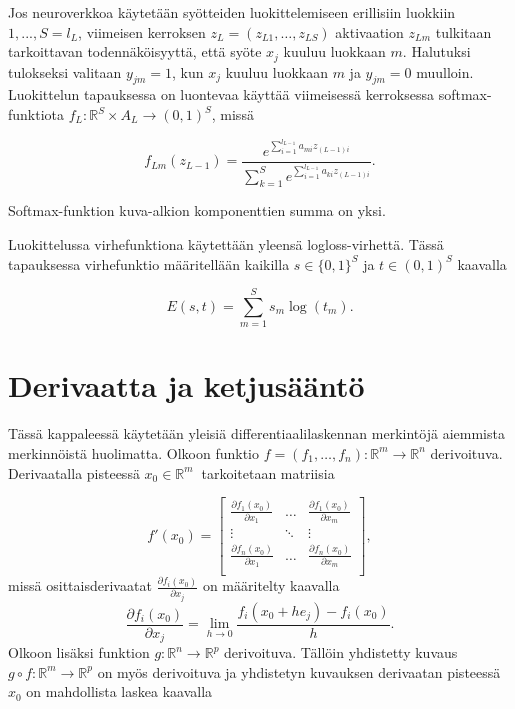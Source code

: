 \documentclass[11pt]{article}
\begin{document}
 Jos neuroverkkoa käytetään syötteiden luokittelemiseen erillisiin luokkiin $1, ..., S = l_L$, viimeisen kerroksen $z_L = (z_{L1}, \hdots, z_{LS})$ aktivaation $z_{Lm}$ tulkitaan tarkoittavan todennäköisyyttä, että syöte $x_j$ kuuluu luokkaan $m$. Halutuksi tulokseksi valitaan $y_{jm} = 1$, kun $x_j$ kuuluu luokkaan $m$ ja $y_{jm} = 0$ muulloin. Luokittelun tapauksessa on luontevaa käyttää viimeisessä kerroksessa softmax-funktiota $f_L : \mathbb{R}^S \times A_L \to (0, 1)^S$, missä

\begin{large}
\begin{equation*}
f_{Lm}(z_{L - 1}) = \frac{e^{\sum_{i = 1}^{l_{L - 1}} a_{mi} z_{(L - 1)i}}}{\sum_{k = 1} ^ {S}e^{\sum_{i = 1}^{l_{L - 1}} a_{ki} z_{(L - 1)i}}} .
\end{equation*}
\end{large}
Softmax-funktion kuva-alkion komponenttien summa on yksi.

Luokittelussa virhefunktiona käytettään yleensä logloss-virhettä. Tässä tapauksessa virhefunktio määritellään kaikilla $s \in \{0, 1\}^S$ ja $t \in (0, 1) ^ S$ kaavalla

\begin{equation*}
E(s, t) = \sum_{m = 1}^{S} s_m \log(t_m).
\end{equation*}

\section{Derivaatta ja ketjusääntö}
Tässä kappaleessä käytetään yleisiä differentiaalilaskennan merkintöjä aiemmista merkinnöistä huolimatta. Olkoon funktio $f = (f_1, \hdots, f_n) : \mathbb{R}^m \to \mathbb{R}^n$ derivoituva. Derivaatalla pisteessä $x_0 \in \mathbb{R}^m\ $ tarkoitetaan matriisia

\begin{equation*}
f'(x_0) = \left[
\begin{matrix}
\frac{\partial f_1(x_0)}{\partial x_1} & \hdots & \frac{\partial f_1(x_0)}{\partial x_m} \\
\vdots  & \ddots & \vdots  \\
\frac{\partial f_n(x_0)}{\partial x_1} & \hdots  & \frac{\partial f_n(x_0)}{\partial x_m} \\
\end{matrix}
 \right],
\end{equation*} missä osittaisderivaatat $\frac{\partial f_i(x_0)}{\partial x_j}$ on määritelty kaavalla 
\begin{equation*}
\frac{\partial f_i(x_0)}{\partial x_j} = \lim_{h \to 0} \frac{f_i(x_0 + h e_j) - f_i(x_0)}{h}.
\end{equation*}
\newpage
Olkoon lisäksi funktion $g : \mathbb{R}^n \to \mathbb{R}^p$ derivoituva. Tällöin yhdistetty kuvaus $g \circ f : \mathbb{R}^m \to \mathbb{R}^p$ on myös derivoituva ja yhdistetyn kuvauksen derivaatan pisteessä $x_0$ on mahdollista laskea kaavalla
\end{document}
